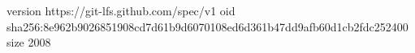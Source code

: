version https://git-lfs.github.com/spec/v1
oid sha256:8e962b9026851908cd7d61b9d6070108ed6d361b47dd9afb60d1cb2fdc252400
size 2008

